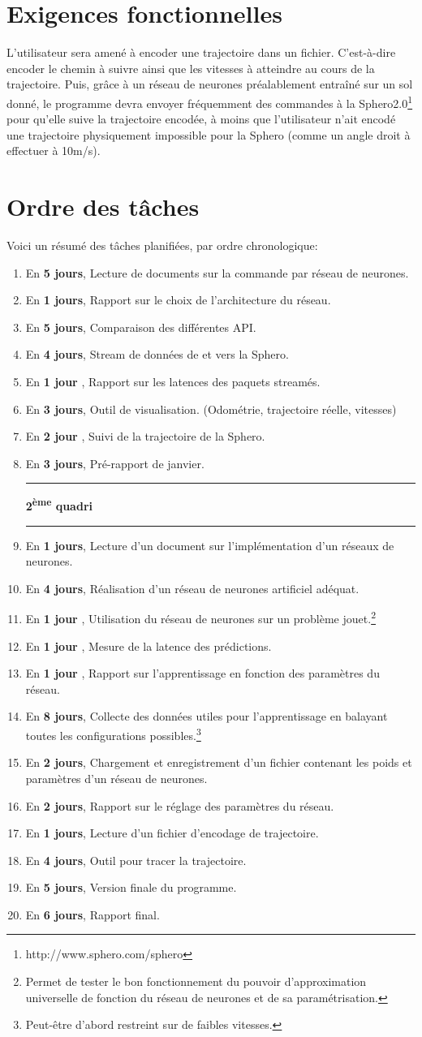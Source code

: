 \documentclass[a4paper, 12pt]{report}
\newcommand{\dure}[1]{\item En \textbf{#1},}
\newcommand{\rul}{\rule{5cm}{0.3mm}}
\begin{document}


\section*{Exigences fonctionnelles}
L'utilisateur sera amené à encoder une trajectoire dans un fichier. C'est-à-dire encoder le chemin à suivre ainsi que les vitesses à atteindre au cours de la trajectoire.
Puis, grâce à un réseau de neurones préalablement entraîné sur un sol donné, le programme devra envoyer fréquemment des commandes à la Sphero2.0\footnote{http://www.sphero.com/sphero} pour qu'elle suive la trajectoire encodée, à moins que l'utilisateur n'ait encodé une trajectoire physiquement impossible pour la Sphero (comme un angle droit à effectuer à 10m/s).

\section*{Ordre des tâches}
Voici un résumé des tâches planifiées, par ordre chronologique:
\begin{enumerate}
 \dure{5 jours} Lecture de documents sur la commande par réseau de neurones.
 \dure{1 jours} Rapport sur le choix de l'architecture du réseau.
 \dure{5 jours} Comparaison des différentes API.
 \dure{4 jours} Stream de données de et vers la Sphero.
 \dure{1 jour } Rapport sur les latences des paquets streamés.
 \dure{3 jours} Outil de visualisation. (Odométrie, trajectoire réelle, vitesses)
 \dure{2 jour } Suivi de la trajectoire de la Sphero.
 \dure{3 jours} Pré-rapport de janvier.\\ \rul\textbf{2\textsuperscript{ème} quadri}\rul
 \dure{1 jours} Lecture d'un document sur l'implémentation d'un réseaux de neurones.
 \dure{4 jours} Réalisation d'un réseau de neurones artificiel adéquat.
 \dure{1 jour } Utilisation du réseau de neurones sur un problème jouet.\footnote{Permet de tester le bon fonctionnement du pouvoir d'approximation universelle de fonction du réseau de neurones et de sa paramétrisation.}
 \dure{1 jour } Mesure de la latence des prédictions.
 \dure{1 jour } Rapport sur l'apprentissage en fonction des paramètres du réseau.
 \dure{8 jours} Collecte des données utiles pour l'apprentissage en balayant toutes les configurations possibles.\footnote{Peut-être d'abord restreint sur de faibles vitesses.}
 \dure{2 jours} Chargement et enregistrement d'un fichier contenant les poids et paramètres d'un réseau de neurones.
 \dure{2 jours} Rapport sur le réglage des paramètres du réseau.
 \dure{1 jours} Lecture d'un fichier d'encodage de trajectoire.
 \dure{4 jours} Outil pour tracer la trajectoire.
 \dure{5 jours} Version finale du programme.
 \dure{6 jours} Rapport final.
\end{enumerate}
\end{document}
